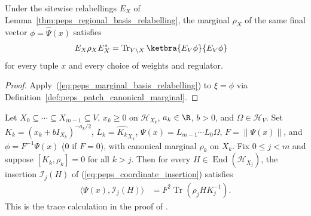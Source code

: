 \begin{lemma}
    \label{thm:peps_patch_basis_relabelling}
    \leanok
    Under the sitewise relabellings $E_X$ of Lemma~\ref{thm:peps_regional_basis_relabelling}, the marginal $\rho_X$ of the same final vector $\phi=\widehat\Psi(x)$ satisfies
    \begin{align}
        E_X\rho_XE_X^*
         & =\operatorname{Tr}_{V\setminus X}
        \ketbra{E_V\phi}{E_V\phi}
        \label{eq:peps_patch_marginal_relabelling}
    \end{align}
    for every tuple $x$ and every choice of weights and regulator.
\end{lemma}
\begin{proof}
    \leanok
    Apply~(\ref{eq:peps_marginal_basis_relabelling}) to $\xi=\phi$ via Definition~\ref{def:peps_patch_canonical_marginal}.
\end{proof}


\begin{lemma}
    \label{thm:peps_patch_insertion_trace}
    \leanok
    Let $X_0\subseteq\cdots\subseteq X_{m-1}\subseteq V$, $x_k\ge0$ on
    $\mathcal H_{X_k}$, $a_k\in\R$, $b>0$, and $\Omega\in\mathcal H_V$. Set
    $K_k=(x_k+bI_{X_k})^{-a_k/2}$, $L_k=\widehat{K_k}_{X_k}$,
    $\Psi(x)=L_{m-1}\cdots L_0\Omega$, $F=\|\Psi(x)\|$,
    and $\phi=F^{-1}\Psi(x)$ ($0$ if $F=0$), with canonical marginal $\rho_k$ on $X_k$.
    Fix $0\le j<m$ and suppose $[K_k,\rho_k]=0$ for all $k>j$.
    Then for every $H\in\operatorname{End}(\mathcal H_{X_j})$, the insertion $\mathcal I_j(H)$ of (\ref{eq:peps_coordinate_insertion}) satisfies
    \begin{align}
        \langle\Psi(x),\mathcal I_j(H)\rangle
         & =F^2\operatorname{Tr}(\rho_j H K_j^{-1}).
        \label{eq:peps_patch_insertion_trace}
    \end{align}
    This is the trace calculation in the proof of
    \cite[Proposition~4.1]{OpenAI2026PolynomialPEPS}.
\end{lemma}

